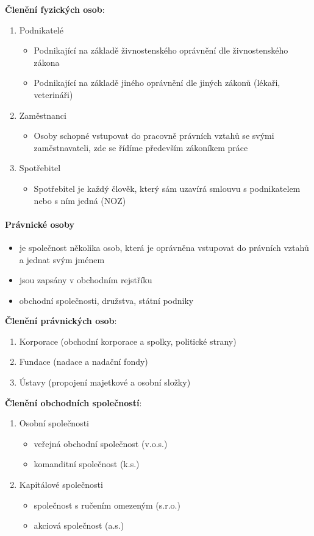 \documentclass[11pt,a4paper,twoside]{book}
\begin{document}
	\textbf{Členění fyzických osob}:
	\begin{enumerate}
		\item Podnikatelé
		\begin{itemize}
			\item Podnikající na základě živnostenského oprávnění dle živnostenského zákona
			\item Podnikající na základě jiného oprávnění dle jiných zákonů (lékaři, veterináři)
		\end{itemize}
		\item Zaměstnanci
		\begin{itemize}
			\item Osoby schopné vstupovat do pracovně právních vztahů se svými zaměstnavateli, zde se řídíme především zákoníkem práce
		\end{itemize}
		\item Spotřebitel
		\begin{itemize}
			\item Spotřebitel je každý člověk, který sám uzavírá smlouvu s podnikatelem nebo s ním jedná (NOZ)
		\end{itemize}
	\end{enumerate}
	
	\paragraph*{Právnické osoby}
	\begin{itemize}
		\item je společnost několika osob, která je oprávněna vstupovat do právních vztahů a jednat svým jménem
		\item jsou zapsány v obchodním rejstříku
		\item obchodní společnosti, družstva, státní podniky
	\end{itemize}
	
	\textbf{Členění právnických osob}:
	\begin{enumerate}
		\item Korporace (obchodní korporace a spolky, politické strany)
		\item Fundace (nadace a nadační fondy)
		\item Ústavy (propojení majetkové a osobní složky)
	\end{enumerate}
	
	\textbf{Členění obchodních společností}:
	\begin{enumerate}
		\item Osobní společnosti
		\begin{itemize}
			\item veřejná obchodní společnost (v.o.s.)
			\item komanditní společnost (k.s.)
		\end{itemize}
		\item Kapitálové společnosti
		\begin{itemize}
			\item společnost s ručením omezeným (s.r.o.)
			\item akciová společnost (a.s.)
		\end{itemize}
	\end{enumerate}
	
\end{document}
